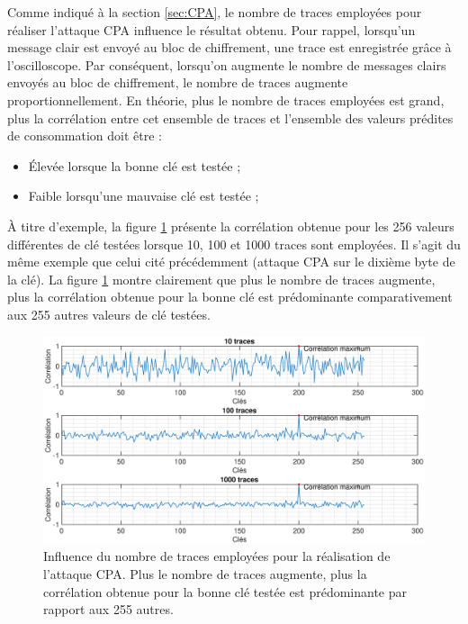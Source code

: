 \documentclass[oneside]{book}
\begin{document}
Comme indiqué à la section \ref{sec:CPA}, le nombre de traces employées pour réaliser l'attaque CPA influence le résultat obtenu. Pour rappel, lorsqu'un message clair est envoyé au bloc de chiffrement, une trace est enregistrée grâce à l'oscilloscope. Par conséquent, lorsqu'on augmente le nombre de messages clairs envoyés au bloc de chiffrement, le nombre de traces augmente proportionnellement. En théorie, plus le nombre de traces employées est grand, plus la corrélation entre cet ensemble de traces et l'ensemble des valeurs prédites de consommation doit être :
\begin{itemize}
\item Élevée lorsque la bonne clé est testée ;
\item Faible lorsqu'une mauvaise clé est testée ;
\end{itemize}
À titre d'exemple, la figure \ref{fig:sim_nb_traces} présente la corrélation obtenue pour les 256 valeurs différentes de clé testées lorsque 10, 100 et 1000 traces sont employées. Il s'agit du même exemple que celui cité précédemment (attaque CPA sur le dixième byte de la clé). La figure \ref{fig:sim_nb_traces} montre clairement que plus le nombre de traces augmente, plus la corrélation obtenue pour la bonne clé est prédominante comparativement aux 255 autres valeurs de clé testées.

\begin{figure}[htbp]
    \hspace{-3.3cm}
    \includegraphics[scale=0.45]{image/sim_nb_traces}
    \caption{Influence du nombre de traces employées pour la réalisation de l'attaque CPA. Plus le nombre de traces augmente, plus la corrélation obtenue pour la bonne clé testée est prédominante par rapport aux 255 autres.}
    \label{fig:sim_nb_traces} 
\end{figure}
\end{document}
